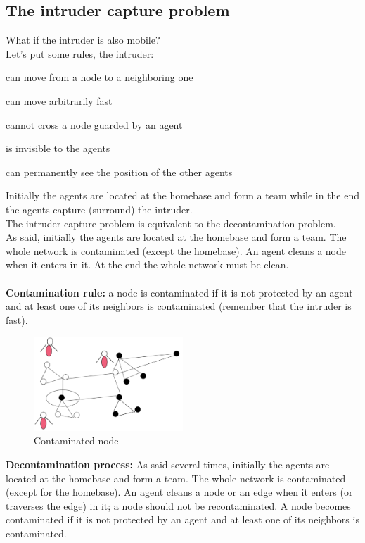 \documentclass[paper=a4, fontsize=11pt]{scrartcl} %
\numberwithin{equation}{section} %
\numberwithin{figure}{section} %
\numberwithin{table}{section} %
\begin{document}
\subsection*{The intruder capture problem}
What if the intruder is also mobile?\\
Let's put some rules, the intruder:
\begin{compactitem}
\item can move from a node to a neighboring one
\item can move arbitrarily fast
\item cannot cross a node guarded by an agent
\item is invisible to the agents
\item can permanently see the position of the other agents
\end{compactitem}

Initially the agents are located at the homebase and form a team while in the end the agents capture (surround) the intruder. \\
The intruder capture problem is equivalent to the decontamination problem.\\
As said, initially the agents are located at the homebase and form a team. The whole network is contaminated (except the homebase). An agent cleans a node when it enters in it. At the end the whole network must be clean.\\ ~ \\
\textbf{Contamination rule:} a node is contaminated if it is not protected by an agent and at least one of its neighbors is contaminated (remember that the intruder is fast). 
\begin{figure}[H]
  \centering
  \includegraphics[width=0.5\textwidth]{img/cont.png}
  \caption{Contaminated node}
  
\end{figure}
\textbf{Decontamination process:} As said several times, initially the agents are located at the homebase and form a team. The whole network is contaminated (except for the homebase). An agent cleans a node or an edge when it enters (or traverses the edge) in it; a node should not be recontaminated. A node becomes contaminated if it is not protected by an agent and at least one of its neighbors is contaminated.
\end{document}
